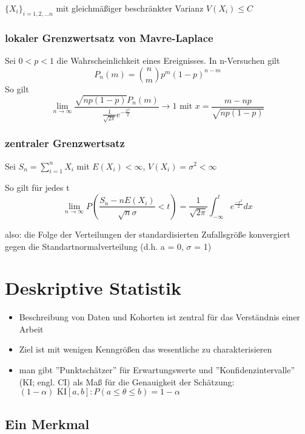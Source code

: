 \documentclass[10pt,a4paper]{article}
\theoremstyle{definition}
\begin{document}
$\{X_i\}_{i=1,2, \ldots n}$ mit gleichmäßiger beschränkter Varianz  $V(X_i) \leq C$


\subsubsection*{lokaler Grenzwertsatz von Mavre-Laplace}
Sei $0<p<1$ die Wahrscheinlichkeit eines Ereignisses.
In n-Versuchen gilt
\[P_n (m) = \binom{n}{m} p^m(1-p)^{n-m}\] So gilt \[\lim\limits_{n \to \infty} \frac{\sqrt{np(1-p)} P_n(m)}{\frac{1}{\sqrt{2 \pi}} e ^{-\frac{x^2}{2}}} \rightarrow  1 \text{ mit } x=\frac{m-np}{\sqrt{np(1-p)}}\]

\subsubsection*{zentraler Grenzwertsatz}

Sei $S_n =  \sum_{i=1}^{n} X_i$ mit $E(X_i)<\infty$, $V(X_i) = \sigma ^2 < \infty$

So gilt für jedes t
\[ \lim\limits_{n \rightarrow \infty} P(\frac{S_n - n E(X_i)}{\sqrt{n} \sigma}< t) = \frac{1}{\sqrt{2\pi} }\int_{-\infty}^{t} e^{\frac{-x^2}{2}} dx
\]

also: die Folge der Verteilungen der standardisierten Zufallsgröße konvergiert gegen die Standartnormalverteilung (d.h. a = 0, $\sigma$ = 1)


\section{Deskriptive Statistik}

\begin{itemize}
	\item Beschreibung von Daten und Kohorten ist zentral für das Verständnis einer Arbeit
	\item Ziel ist mit wenigen Kenngrößen das wesentliche zu charakterisieren 
	\item man gibt ''Punktschätzer''  für Erwartungswerte und ''Konfidenzintervalle'' (KI; engl. CI) als Maß für die Genauigkeit der Schätzung:\\
	$(1- \alpha) \text{ KI} [a,b] : P(a \leq \theta \leq b) = 1-\alpha$
\end{itemize}


\subsection{Ein Merkmal}
\end{document}
